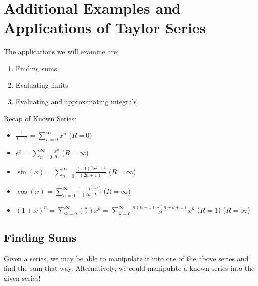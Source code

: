 \section{Additional Examples and Applications of Taylor Series}
The applications we will examine are:
\begin{enumerate}[label=(\Roman*)]
    \item Finding sums
    \item Evaluating limits
    \item Evaluating and approximating integrals
\end{enumerate}
\underline{Recap of Known Series}:
\begin{itemize}
    \item $ \displaystyle \frac{1}{1-x} =\sum\limits_{n=0}^{\infty} x^n $ ($ R=0 $)
    \item $ \displaystyle e^x=\sum\limits_{n=0}^{\infty} \frac{x^n}{n!}  $ ($ R=\infty $)
    \item $ \displaystyle \sin(x)=\sum\limits_{n=0}^\infty \frac{(-1)^n x^{2n+1}}{(2n+1)!} $
          ($ R=\infty $)
    \item $ \displaystyle \cos(x)=\sum\limits_{n=0}^\infty \frac{(-1)^n x^{2n}}{(2n)!} $
          ($ R=\infty $)
    \item $ \displaystyle (1+x)^n=\sum\limits_{k=0}^{\infty}\binom{n}{k}x^k
              =\sum\limits_{k=0}^{\infty} \frac{n(n-1)\cdots(n-k+1)}{k!} x^k  $ ($ R=1 $)
          ($ R=\infty $)
\end{itemize}


\subsection*{Finding Sums}
Given a series, we may be able to manipulate
it into one of the above series and find the sum that way. Alternatively, we could
manipulate a known series into the given series!

